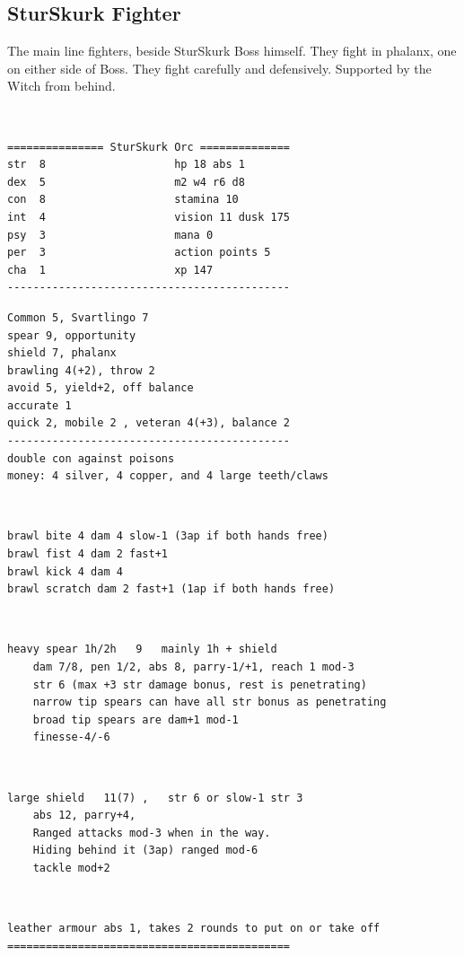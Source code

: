 \subsection*{SturSkurk Fighter}

The main line fighters, beside SturSkurk Boss himself. They fight in phalanx, one on either side of Boss. They fight carefully and defensively. Supported by the Witch from behind.

\

\goodbreak \small \begin{samepage} \begin{verbatim}
=============== SturSkurk Orc ==============
str  8                    hp 18 abs 1
dex  5                    m2 w4 r6 d8
con  8                    stamina 10
int  4                    vision 11 dusk 175
psy  3                    mana 0
per  3                    action points 5
cha  1                    xp 147
--------------------------------------------
\end{verbatim} \goodbreak \begin{verbatim}
Common 5, Svartlingo 7
spear 9, opportunity
shield 7, phalanx
brawling 4(+2), throw 2
avoid 5, yield+2, off balance
accurate 1
quick 2, mobile 2 , veteran 4(+3), balance 2
--------------------------------------------
double con against poisons
money: 4 silver, 4 copper, and 4 large teeth/claws
\end{verbatim} \end{samepage}   \   \goodbreak \begin{samepage} \begin{verbatim}
brawl bite 4 dam 4 slow-1 (3ap if both hands free)
brawl fist 4 dam 2 fast+1
brawl kick 4 dam 4
brawl scratch dam 2 fast+1 (1ap if both hands free)
\end{verbatim} \end{samepage}   \   \goodbreak \begin{samepage} \begin{verbatim}
heavy spear 1h/2h   9   mainly 1h + shield
    dam 7/8, pen 1/2, abs 8, parry-1/+1, reach 1 mod-3
    str 6 (max +3 str damage bonus, rest is penetrating)
    narrow tip spears can have all str bonus as penetrating
    broad tip spears are dam+1 mod-1
    finesse-4/-6
\end{verbatim} \end{samepage}   \   \goodbreak \begin{samepage} \begin{verbatim}
large shield   11(7) ,   str 6 or slow-1 str 3
    abs 12, parry+4,
    Ranged attacks mod-3 when in the way.
    Hiding behind it (3ap) ranged mod-6
    tackle mod+2
\end{verbatim} \end{samepage}   \   \goodbreak \begin{samepage} \begin{verbatim}
leather armour abs 1, takes 2 rounds to put on or take off
============================================
\end{verbatim} \end{samepage} \normalsize


